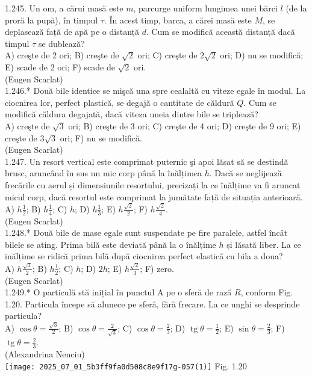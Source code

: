 {1.245. Un om, a cărui masă este $m$, parcurge uniform lungimea unei bărci $l$ (de la proră la pupă), în timpul $\tau$. În acest timp, barca, a cărei masă este $M$, se deplasează faṭă de apă pe o distanță $d$. Cum se modifică această distanță dacă timpul $\tau$ se dublează?\\ A) creşte de 2 ori; B) creşte de $\sqrt{2}$ ori; C) creşte de $2 \sqrt{2}$ ori; D) nu se modifică; E) scade de 2 ori; F) scade de $\sqrt{2}$ ori.\\ (Eugen Scarlat)\\

1.246.* Două bile identice se mişcă una spre cealaltă cu viteze egale în modul. La ciocnirea lor, perfect plastică, se degajă o cantitate de căldură $Q$. Cum se modifică căldura degajată, dacă viteza uneia dintre bile se triplează?\\ A) creşte de $\sqrt{3}$ ori; B) creşte de 3 ori; C) creşte de 4 ori; D) creşte de 9 ori; E) creşte de $3 \sqrt{3}$ ori; F) nu se modifică.\\ (Eugen Scarlat)\\

1.247. Un resort vertical este comprimat puternic şi apoi lăsat să se destindă brusc, aruncând în sus un mic corp până la înălțimea $h$. Dacă se neglijează frecările cu aerul și dimensiunile resortului, precizați la ce înălțime va fi aruncat micul corp, dacă resortul este comprimat la jumătate față de situația anterioară.\\ A) $h \frac{1}{2}$; B) $h \frac{1}{4}$; C) $h$; D) $h \frac{1}{3}$; E) $h \frac{\sqrt{2}}{2}$; F) $h \frac{\sqrt{2}}{4}$.\\ (Eugen Scarlat)\\

1.248.* Două bile de mase egale sunt suspendate pe fire paralele, astfel încât bilele se ating. Prima bilă este deviată până la o înălțime $h$ și lăsată liber. La ce inălțime se ridică prima bilă după ciocnirea perfect elastică cu bila a doua?\\ A) $h \frac{\sqrt{3}}{2}$; B) $h \frac{1}{2}$; C) $h$; D) $2 h$; E) $h \frac{\sqrt{2}}{3}$; F) zero.\\ (Eugen Scarlat)\\

1.249.* O particulă stă inițial în punctul A pe o sferă de rază $R$, conform Fig. 1.20. Particula începe să alunece pe sferă, fără frecare. La ce unghi se desprinde particula?\\ A) $\cos \theta=\frac{\sqrt{3}}{2}$; B) $\cos \theta=\frac{2}{\sqrt{3}}$; C) $\cos \theta=\frac{2}{3}$; D) $\operatorname{tg} \theta=\frac{1}{2}$; E) $\sin \theta=\frac{2}{3}$; F) $\operatorname{tg} \theta=\frac{2}{3}$.\\ (Alexandrina Nenciu)\\ \texttt{[image: 2025\_07\_01\_5b3ff9fa0d508c8e9f17g-057(1)]} Fig. 1.20\\

}
